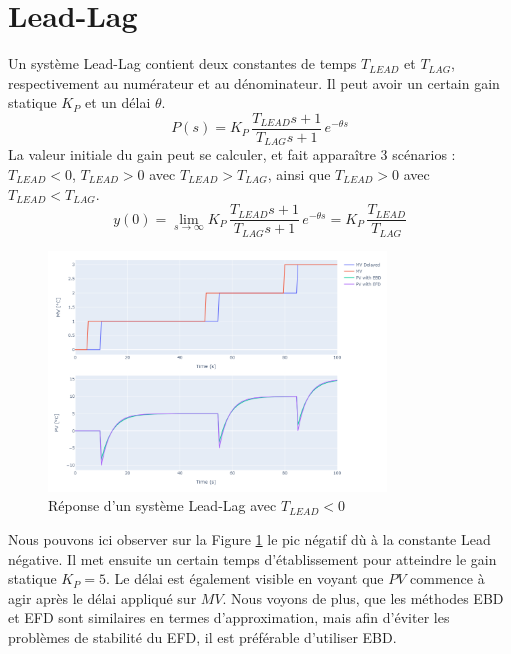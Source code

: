 \section{Lead-Lag}

Un système Lead-Lag contient deux constantes de temps $T_{LEAD}$ et $T_{LAG}$, respectivement au numérateur et au dénominateur. Il peut avoir un certain gain statique $K_P$ et un délai $\theta$.
\begin{equation}
    P(s) = K_P \, \frac{T_{LEAD} s + 1}{T_{LAG} s + 1} \, e^{-\theta s}
\end{equation}
La valeur initiale du gain peut se calculer, et fait apparaître 3 scénarios : $T_{LEAD} < 0$, $T_{LEAD} > 0$ avec $T_{LEAD} > T_{LAG}$, ainsi que $T_{LEAD} > 0$ avec $T_{LEAD} < T_{LAG}$.
\begin{equation}
    y(0) = \lim_{s \to \infty} K_P \, \frac{T_{LEAD} s + 1}{T_{LAG} s + 1} \, e^{-\theta s} = K_P \, \frac{T_{LEAD}}{T_{LAG}}
\end{equation}
\begin{figure}[H]
    \centering
    \includegraphics[width=0.8\textwidth]{../Plots/Lead-Lag/LL_Lead_negative.png}
    \caption{Réponse d'un système Lead-Lag avec $T_{LEAD} < 0$}
    \label{fig:Tlead_neg}
\end{figure}
Nous pouvons ici observer sur la Figure \ref{fig:Tlead_neg} le pic négatif dù à la constante Lead négative.
Il met ensuite un certain temps d'établissement pour atteindre le gain statique $K_P = 5$.
Le délai est également visible en voyant que $PV$ commence à agir après le délai appliqué sur $MV$.
Nous voyons de plus, que les méthodes EBD et EFD sont similaires en termes d'approximation, mais afin d'éviter les problèmes de stabilité du EFD, il est préférable d'utiliser EBD.

